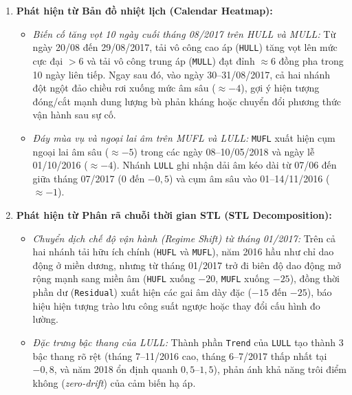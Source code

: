 \documentclass[12pt,a4paper,oneside]{report}
\newcommand{\code}[1]{\texttt{#1}}
\begin{document}
\begin{enumerate}
  \item \textbf{Phát hiện từ Bản đồ nhiệt lịch (Calendar Heatmap):}
  \begin{itemize}
    \item \textit{Biến cố tăng vọt 10 ngày cuối tháng 08/2017 trên HULL và MULL:} Từ ngày 20/08 đến 29/08/2017, tải vô công cao áp (\code{HULL}) tăng vọt lên mức cực đại $> 6$ và tải vô công trung áp (\code{MULL}) đạt đỉnh $\approx 6$ đồng pha trong 10 ngày liên tiếp. Ngay sau đó, vào ngày 30--31/08/2017, cả hai nhánh đột ngột đảo chiều rơi xuống mức âm sâu ($\approx -4$), gợi ý hiện tượng đóng/cắt mạnh dung lượng bù phản kháng hoặc chuyển đổi phương thức vận hành sau sự cố.
    \item \textit{Đáy mùa vụ và ngoại lai âm trên MUFL và LULL:} \code{MUFL} xuất hiện cụm ngoại lai âm sâu ($\approx -5$) trong các ngày 08--10/05/2018 và ngày lễ 01/10/2016 ($\approx -4$). Nhánh \code{LULL} ghi nhận dải âm kéo dài từ 07/06 đến giữa tháng 07/2017 ($0$ đến $-0{,}5$) và cụm âm sâu vào 01--14/11/2016 ($\approx -1$).
  \end{itemize}

  \item \textbf{Phát hiện từ Phân rã chuỗi thời gian STL (STL Decomposition):}
  \begin{itemize}
    \item \textit{Chuyển dịch chế độ vận hành (Regime Shift) từ tháng 01/2017:} Trên cả hai nhánh tải hữu ích chính (\code{HUFL} và \code{MUFL}), năm 2016 hầu như chỉ dao động ở miền dương, nhưng từ tháng 01/2017 trở đi biên độ dao động mở rộng mạnh sang miền âm (\code{HUFL} xuống $-20$, \code{MUFL} xuống $-25$), đồng thời phần dư (\code{Residual}) xuất hiện các gai âm dày đặc ($-15$ đến $-25$), báo hiệu hiện tượng trào lưu công suất ngược hoặc thay đổi cấu hình đo lường.
    \item \textit{Đặc trưng bậc thang của LULL:} Thành phần \code{Trend} của \code{LULL} tạo thành 3 bậc thang rõ rệt (tháng 7--11/2016 cao, tháng 6--7/2017 thấp nhất tại $-0{,}8$, và năm 2018 ổn định quanh $0{,}5$--$1{,}5$), phản ánh khả năng trôi điểm không (\textit{zero-drift}) của cảm biến hạ áp.
  \end{itemize}


\end{enumerate}
\end{document}
